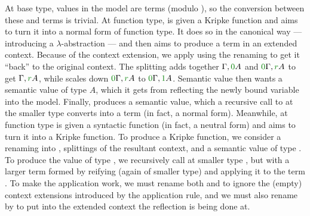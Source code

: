 At base type, values in the model are terms (modulo ), so the
conversion between these and terms is trivial.
At function type,  is given a Kripke function
 and aims to turn it into a normal form of function type.
It does so in the canonical way --- introducing a $\lambda$-abstraction --- and
then aims to produce a term in an extended context.
Because of the context extension, we apply  using the renaming
\AgdaSpace{}\AgdaSymbol{:}\AgdaSpace{}%
\AgdaBound{$\Gamma$}\AgdaSpace{}\AgdaSpace{}%
\AgdaFunction{[}\AgdaSpace{}\AgdaSpace{}\AgdaFunction{$\bullet$}%
\AgdaSpace{}\AgdaSpace{}\AgdaFunction{]$^c$}
to get it ``back'' to the original context.
The splitting  adds together $\Gamma, \gr0A$ and
$\gr0\Gamma, \gr rA$ to get $\Gamma, \gr rA$, while  scales down
$\gr0\Gamma, \gr rA$ to $\gr0\Gamma, \gr1A$.
Semantic value  then wants a semantic value of type $A$, which it
gets from reflecting the newly bound variable into the model.
Finally,  produces a semantic value, which a recursive call to
 at the smaller type  converts into a term
(in fact, a normal form).
Meanwhile,  at function type is given a syntactic
function (in fact, a neutral form) and aims to turn it into a Kripke function.
To produce a Kripke function, we consider a renaming \AgdaBound{$\rho$} into
\AgdaBound{$\Gamma$}, splittings of the resultant context, and a semantic value
 of type .
To produce the value of type , we recursively call
 at smaller type , but with a larger term
formed by reifying  (again of smaller type) and applying it to the
term .
To make the application work, we must rename both  and
 to ignore the (empty) context extensions introduced by the
application rule, and we must also rename  by \AgdaBound{$\rho$} to
put  into the extended context the reflection is being done at.


